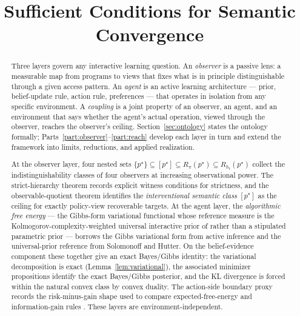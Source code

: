 \documentclass[11pt]{article}
\title{Sufficient Conditions for Semantic Convergence}
\author{}
\date{}
\theoremstyle{definition}
\theoremstyle{remark}
\theoremstyle{plain}
\theoremstyle{definition}
\begin{document}
\maketitle

\begin{abstract}
Three layers govern any interactive learning question. An \emph{observer} is a passive lens: a measurable map from programs to views that fixes what is in principle distinguishable through a given access pattern. An \emph{agent} is an active learning architecture --- prior, belief-update rule, action rule, preferences --- that operates in isolation from any specific environment. A \emph{coupling} is a joint property of an observer, an agent, and an environment that says whether the agent's actual operation, viewed through the observer, reaches the observer's ceiling. Section~\ref{sec:ontology} states the ontology formally; Parts~\ref{part:observer}--\ref{part:reach} develop each layer in turn and extend the framework into limits, reductions, and applied realization.

\medskip
\noindent
At the observer layer, four nested sets $\{p^\star\}\subseteq[p^\star]\subseteq R_\pi(p^\star)\subseteq R_{h_t}(p^\star)$ collect the indistinguishability classes of four observers at increasing observational power. The strict-hierarchy theorem records explicit witness conditions for strictness, and the observable-quotient theorem identifies the \emph{interventional semantic class} $[p^\star]$ as the ceiling for exactly policy-view recoverable targets. At the agent layer, the \emph{algorithmic free energy} --- the Gibbs-form variational functional whose reference measure is the Kolmogorov-complexity-weighted universal interactive prior of \citet{Solomonoff1964a,Solomonoff1964b,Kolmogorov1965,Hutter2005} rather than a stipulated parametric prior --- borrows the Gibbs variational form from active inference and the universal-prior reference from Solomonoff and Hutter. On the belief-evidence component these together give an exact Bayes/Gibbs identity: the variational decomposition is exact (Lemma~\ref{lem:variational}), the associated minimizer propositions identify the exact Bayes/Gibbs posterior, and the KL divergence is forced within the natural convex class by convex duality. The action-side boundary proxy records the risk-minus-gain shape used to compare expected-free-energy and information-gain rules \citep{Friston2010,Lindley1956,ChalonerVerdinelli1995,MacKay1992,OrtegaBraun2013,Schmidhuber1991,Schmidhuber2010}. These layers are environment-independent.


\end{abstract}
\end{document}
